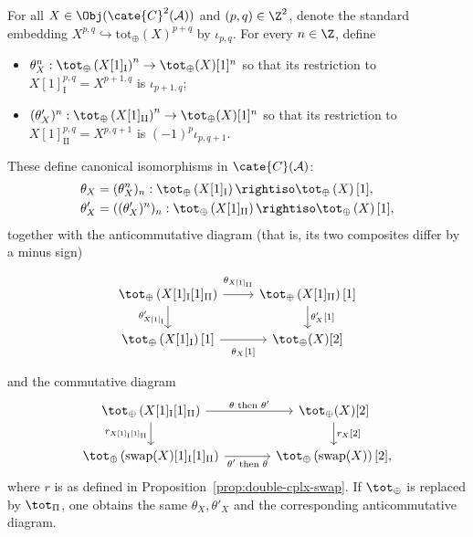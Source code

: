 \begin{proposition}\label{prop:tot-shift}
	For all $X\in\Obj(\cate{C}^2(\mathcal{A}))$ and $(p,q)\in\Z^2$, denote
	the standard embedding $X^{p,q}\hookrightarrow
	\mathrm{tot}_{\oplus}(X)^{p+q}$ by $\iota_{p,q}$. For every $n\in\Z$,
	define
	\begin{itemize}
		\item $\theta_X^n:\tot_{\oplus}\left(X[1]_{\mathrm{I}}\right)^n\to
		\tot_{\oplus}(X)[1]^n$ so that its restriction to
		$X[1]_{\mathrm{I}}^{p,q}=X^{p+1,q}$ is $\iota_{p+1,q}$;
		\item $(\theta'_X)^n:\tot_{\oplus}\left(X[1]_{\mathrm{II}}\right)^n
		\to\tot_{\oplus}(X)[1]^n$ so that its restriction to
		$X[1]_{\mathrm{II}}^{p,q}=X^{p,q+1}$ is
		$(-1)^p\iota_{p,q+1}$.
	\end{itemize}
	These define canonical isomorphisms in $\cate{C}(\mathcal{A})$:
	\begin{align*}
		\theta_X & = (\theta_X^n)_n: \tot_{\oplus} \left( X[1]_{\mathrm{I}} \right) \rightiso \tot_{\oplus} \left(X\right)[1], \\
		\theta'_X & = ((\theta'_X)^n)_n: \tot_{\oplus} \left( X[1]_{\mathrm{II}} \right) \rightiso \tot_{\oplus} \left(X\right)[1],
	\end{align*}
	together with the anticommutative diagram (that is, its two composites
	differ by a minus sign)
	\[\begin{tikzcd}
		\tot_{\oplus} \left( X[1]_{\mathrm{I}}[1]_{\mathrm{II}}\right) \arrow[r, "{\theta_{X[1]_{\mathrm{II}}}}" inner sep=0.6em] \arrow[d, "{\theta'_{X[1]_{\mathrm{I}}}}"'] & \tot_{\oplus}\left(X[1]_{\mathrm{II}}\right)[1] \arrow[d, "{\theta'_X [1]}"] \\
		\tot_{\oplus} \left( X[1]_{\mathrm{I}}\right)[1] \arrow[r, "{\theta_X [1]}"' inner sep=0.6em] & \tot_{\oplus}(X)[2]
	\end{tikzcd}\]
	and the commutative diagram
	\[\begin{tikzcd}[column sep=large]
		\tot_{\oplus} \left( X[1]_{\mathrm{I}}[1]_{\mathrm{II}} \right) \arrow[r, "\text{$\theta$ then $\theta'$}"] \arrow[d, "{r_{X[1]_{\mathrm{I}}[1]_{\mathrm{II}}}}"'] & \tot_{\oplus}(X)[2] \arrow[d, "{r_X[2]}"] \\
		\tot_{\oplus}\left( \mathrm{swap}(X)[1]_{\mathrm{I}}[1]_{\mathrm{II}} \right) \arrow[r, "\text{$\theta'$ then $\theta$}"'] & \tot_{\oplus}\left(\mathrm{swap}(X)\right)[2],
	\end{tikzcd}\]
	where $r$ is as defined in Proposition~\ref{prop:double-cplx-swap}. If
	$\tot_{\oplus}$ is replaced by $\tot_{\Pi}$, one obtains the same
	$\theta_X,\theta'_X$ and the corresponding anticommutative diagram.
\end{proposition}
